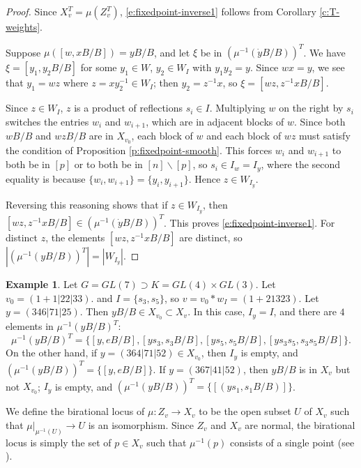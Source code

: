 \documentclass[11pt,letterpaper,reqno]{amsart}
\numberwithin{equation}{section}
\theoremstyle{plain}
\theoremstyle{definition}
\newtheorem{example}[theorem]{Example}
\theoremstyle{remark}
\begin{document}
\begin{proof}
Since $X_v^T = \mu(Z_v^T)$, \eqref{e:fixedpoint-inverse1} follows from Corollary \ref{c:T-weights}.  

Suppose $\mu([w,xB/B]) = y B/B$, and let
$\xi$ be in $(\mu^{-1}(\dot{y}B/B))^T$.
We have
$\xi = [y_1, y_2 B/B]$ for some $y_1 \in W$, $y_2 \in W_I$ with $y_1 y_2 = y$.  Since $wx = y$, we
see that $y_1 = w z$ where $z = x y_2^{-1} \in W_I$; then $y_2 = z^{-1}x$, so $\xi = [w z, z^{-1} x B/B]$.

Since $z \in W_I$, 
$z$ is a product of reflections $s_{i} \in I$.  Multiplying $w$ on the right by $s_i$ switches the entries $w_i$ and $w_{i+1}$, which are in
adjacent blocks of $w$.  Since both $wB/B$ and $w z B/B$ are in
$X_{v_0}$, each block of $w$ and each block of $wz$ must satisfy the condition of Proposition \ref{p:fixedpoint-smooth}.  This
forces  $w_i$ and $w_{i+1}$ to both be in $[p]$ or to both be in $[n] \smallsetminus [p]$, so $s_i \in I_w = I_y$, where the second equality is because
$\{w_i, w_{i+1} \} = \{y_i, y_{i+1} \} $.  Hence $z \in W_{I_y}$.  

Reversing this reasoning shows that if $z \in W_{I_y}$, then
$[w z, z^{-1} x B/B ] \in (\mu^{-1}(\dot{y}B/B))^T $.  This proves \eqref{e:fixedpoint-inverse1}.  
For distinct $z$, the elements $[w z, z^{-1} x B/B ] $ are distinct, so 
$| (\mu^{-1}(yB/B))^T | = | W_{I_y} |$.
\end{proof}

\begin{example}
Let $G = GL(7) \supset K = GL(4) \times GL(3)$.  Let $v_0 = (1 + 1 | 2 2 | 3 3)$. and $I = \{ s_3, s_5 \}$, so $v = v_0 * w_I = (1 + 2 1 3 2 3)$. 
Let $y = (3 4 6 | 7 1 | 2 5)$.  Then $yB/B \in X_{v_0} \subset X_v$.  In this case, $I_y = I$, and there are $4$ elements in $\mu^{-1}(yB/B)^T$:
$$
\mu^{-1}(yB/B)^T = \{ [y, eB/B],[y s_3, s_3 B/B],  [y s_5, s_5 B/B],  [ys_3 s_5, s_3 s_5 B/B] \}.
$$
On the other hand, if $y = (3 6 4 | 7 1 | 5 2) \in X_{v_0}$, then $I_y$ is empty, and $(\mu^{-1}(yB/B))^T = \{ [y, eB/B] \}$.  
If $y = (3 6 7 | 4 1 | 5 2)$, then $yB/B$ is in $X_v$ but not $X_{v_0}$; $I_y$ is empty, and $(\mu^{-1}(yB/B))^T = \{ [(y s_1, s_1 B/B)] \}$.
\end{example}

We define the birational locus of $\mu: Z_v \to X_v$ to be the open subset $U$ of $X_v$ such
that $\mu|_{\mu^{-1}(U)} \to U$ is an isomorphism.  Since $Z_v$ and $X_v$ are normal, the birational locus is simply
the set of $p \in X_v$ such that $\mu^{-1}(p)$ consists of a single point (see \cite[AG.18]{Borel1991}).
\end{document}
